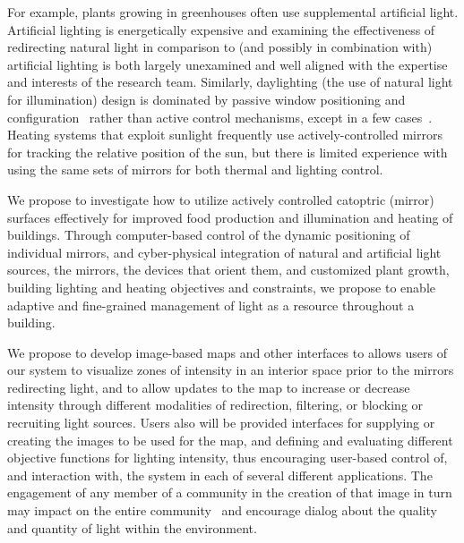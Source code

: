 For example, plants growing in greenhouses often use supplemental artificial
light. Artificial lighting is energetically expensive and examining the
effectiveness of redirecting natural light in comparison to
(and possibly in combination with)
artificial lighting is both largely unexamined and well aligned with the
expertise and interests of the research team.
Similarly, daylighting (the use of natural light for illumination) design is
dominated by passive window positioning and configuration~\cite{vgf+13}
rather than
active control mechanisms, except in a few cases~\cite{kt16}.
Heating systems that
exploit sunlight frequently use actively-controlled mirrors for tracking the
relative position of the sun, but there is limited experience with using the
same sets of mirrors for both thermal and lighting control.

We propose to investigate how to utilize actively controlled catoptric (mirror)
surfaces effectively for improved food production and illumination and heating
of buildings. Through computer-based control of the dynamic positioning of
individual mirrors, and cyber-physical integration of natural and artificial
light sources, the mirrors, the devices that orient them, and customized plant
growth, building lighting and heating objectives and constraints, we propose to
enable adaptive and fine-grained management of light as a resource throughout a
building.

We propose to develop image-based maps and other interfaces to allows users of
our system to visualize zones of intensity in an interior space prior to the
mirrors redirecting light, and to allow updates to the map to increase or
decrease intensity through different modalities of redirection, filtering, or
blocking or recruiting light sources. Users also will be provided interfaces
for supplying or creating the images to be used for the map, and defining and
evaluating different objective functions for lighting intensity, thus
encouraging user-based control of, and interaction with, the system in each of
several different applications. The engagement of any member of a community in
the creation of that image in turn may impact on the entire
community~\cite{BS13} and
encourage dialog about the quality and quantity of light within the
environment.

